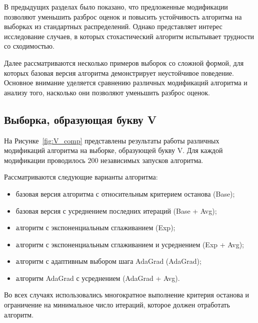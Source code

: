 В предыдущих разделах было показано, что предложенные модификации позволяют уменьшить разброс оценок и повысить устойчивость алгоритма на выборках из стандартных распределений. Однако представляет интерес исследование случаев, в которых стохастический алгоритм испытывает трудности со сходимостью.

Далее рассматриваются несколько примеров выборок со сложной формой, для которых базовая версия алгоритма демонстрирует неустойчивое поведение. Основное внимание уделяется сравнению различных модификаций алгоритма и анализу того, насколько они позволяют уменьшить разброс оценок.

\subsection{Выборка, образующая букву V}

На Рисунке~\ref{fig:V_comp} представлены результаты работы различных модификаций алгоритма на выборке, образующей букву V. Для каждой модификации проводилось $200$ независимых запусков алгоритма.

Рассматриваются следующие варианты алгоритма:
\begin{itemize}
    \item базовая версия алгоритма с относительным критерием останова (Base);
    
    \item базовая версия с усреднением последних итераций (Base + Avg);
    
    \item алгоритм с экспоненциальным сглаживанием (Exp);
    
    \item алгоритм с экспоненциальным сглаживанием и усреднением (Exp + Avg);
    
    \item алгоритм с адаптивным выбором шага AdaGrad (AdaGrad);
    
    \item алгоритм AdaGrad с усреднением (AdaGrad + Avg).
\end{itemize}

Во всех случаях использовались многократное выполнение критерия останова и ограничение на минимальное число итераций, которое должен отработать алгоритм.

